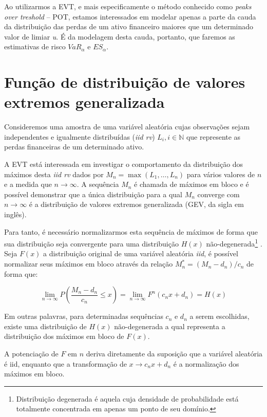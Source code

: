 \documentclass[review]{elsarticle}
\theoremstyle{definition}
\begin{document}
Ao utilizarmos a EVT, e mais especificamente o método conhecido como \emph{peaks over treshold} – POT, estamos interessados em modelar apenas a parte da cauda da distribuição das perdas de um ativo financeiro maiores que um determinado valor de limiar \emph{u}. É da modelagem desta cauda, portanto, que faremos as estimativas de risco $VaR_\alpha$ e $ES_\alpha$.

\section{Função de distribuição de valores extremos generalizada}\label{sec:GEV}

Consideremos uma amostra de uma variável aleatória cujas observações sejam independentes e igualmente distribuídas (\emph{iid rv}) $L_i,i\in \mathbb{N}$ que represente as perdas financeiras de um determinado ativo.

A EVT está interessada em investigar o comportamento da distribuição dos máximos desta \emph{iid rv} dados por $M_n = \max (L_1, \ldots , L_n)$ para vários valores de $n$ e a medida que $n\rightarrow \infty$. A sequência $M_n$ é chamada de máximos em bloco e é possível demonstrar que a única distribuição para a qual $M_n$ converge com $n\rightarrow \infty$ é a distribuição de valores extremos generalizada (GEV, da sigla em inglês).

Para tanto, é necessário normalizarmos esta sequência de máximos de forma que sua distribuição seja convergente para uma distribuição $H(x)$ não-degenerada\footnote{Distribuição degenerada é aquela cuja densidade de probabilidade está totalmente concentrada em apenas um ponto de seu domínio.} . Seja $F(x)$ a distribuição original de uma variável aleatória \emph{iid}, é possível normalizar seus máximos em bloco através da relação $M_n^*=(M_n-d_n)/c_n$ de forma que:

\begin{equation}
\label{eq:H}
\lim_{n \rightarrow \infty} P\left(\frac{M_n-d_n}{c_n} \leq x \right) 
= \lim_{n \rightarrow \infty} F^n(c_nx + d_n)
= H(x)
\end{equation}

Em outras palavras, para determinadas sequências $c_n$ e $d_n$ a serem escolhidas, existe uma distribuição de $H(x)$ não-degenerada a qual representa a distribuição dos máximos em bloco de $F(x)$.

A potenciação de $F$ em $n$ deriva diretamente da suposição que a variável aleatória é iid, enquanto que a transformação de $x \rightarrow c_n x+d_n$ é a normalização dos máximos em bloco.
\end{document}
